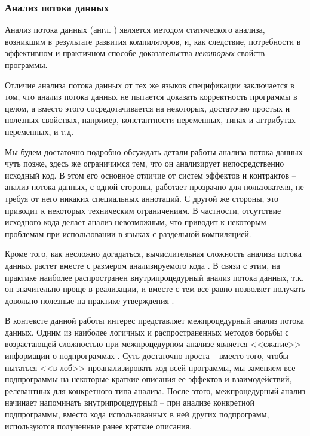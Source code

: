 \subsubsection{Анализ потока данных}

Анализ потока данных (англ. ) является методом статического анализа, возникшим в результате развития компиляторов, и, как следствие, потребности в эффективном и практичном способе доказательства \emph{некоторых} свойств программы.

Отличие анализа потока данных от тех же языков спецификации заключается в том, что анализ потока данных не пытается доказать корректность программы в целом, а вместо этого сосредотачивается на некоторых, достаточно простых и полезных свойствах, например, константности переменных, типах и аттрибутах переменных, и т.д. \cite{Sharir78}

Мы будем достаточно подробно обсуждать детали работы анализа потока данных чуть позже, здесь же ограничимся тем, что он анализирует непосредственно исходный код. В этом его основное отличие от систем эффектов и контрактов -- анализ потока данных, с одной стороны, работает прозрачно для пользователя, не требуя от него никаких специальных аннотаций. С другой же стороны, это приводит к некоторых техническим ограничениям. В частности, отсутствие исходного кода делает анализ невозможным, что приводит к некоторым проблемам при использовании в языках с раздельной компиляцией.

Кроме того, как несложно догадаться, вычислительная сложность анализа потока данных растет вместе с размером анализируемого кода \cite{Sagiv96}. В связи с этим, на практике наиболее распространен внутрипроцедурный анализ потока данных, т.к. он значительно проще в реализации, и вместе с тем все равно позволяет получать довольно полезные на практике утверждения \cite{dragon-book}.

В контексте данной работы интерес представляет межпроцедурный анализ потока данных. Одним из наиболее логичных и распространенных методов борьбы с возрастающей сложностью при межпроцедурном анализе является <<сжатие>> информации о подпрограммах \cite{Weihl80, Barth78}. Суть достаточно проста -- вместо того, чтобы пытаться <<в лоб>> проанализировать код всей программы, мы заменяем все подпрограммы на некоторые краткие описания ее эффектов и взаимодействий, релевантных для конкретного типа анализа. После этого, межпроцедурный анализ начинает напоминать внутрипроцедурный -- при анализе конкретной подпрограммы, вместо кода использованных в ней других подпрограмм, используются полученные ранее краткие описания.

